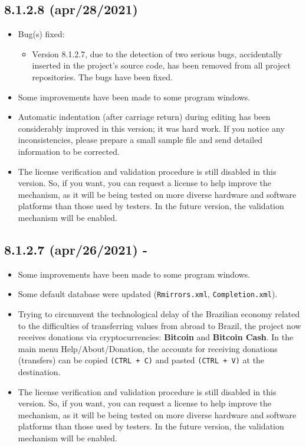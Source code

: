 \subsection*{8.1.2.8 (apr/28/2021)}
\begin{itemize}
  \item Bug(s) fixed:
    \begin{itemize}
      \item Version 8.1.2.7, due to the detection of two serious bugs, accidentally
        inserted in the project's source code, has been removed from all project repositories.
        The bugs have been fixed. \color{darkred}{It is strongly recommended not to use version 8.1.2.7!}
    \end{itemize}
  \item Some improvements have been made to some program windows.
  \item Automatic indentation (after carriage return) during editing has been considerably
    improved in this version; it was hard work. If you notice any inconsistencies,
    please prepare a small sample file and send detailed information to be corrected.
  \item The license verification and validation procedure is still disabled in this version.
    So, if you want, you can request a license to help improve the mechanism,
    as it will be being tested on more diverse hardware and software platforms than
    those used by testers. In the future version, the validation mechanism will be enabled.
\end{itemize}

\subsection*{8.1.2.7 (apr/26/2021) - \color{darkred}{Removed from all project repositories}}
\begin{itemize}
  \item Some improvements have been made to some program windows.
  \item Some default database were updated (\texttt{Rmirrors.xml}, \texttt{Completion.xml}).
  \item Trying to circumvent the technological delay of the Brazilian economy related to
    the difficulties of transferring values from abroad to Brazil, the project now receives
    donations via cryptocurrencies: \textbf{Bitcoin} and \textbf{Bitcoin Cash}.
    In the main menu Help/About/Donation, the accounts for receiving donations (transfers)
    can be copied \texttt{(CTRL + C)} and pasted \texttt{(CTRL + V)} at the destination.
  \item The license verification and validation procedure is still disabled in this version.
    So, if you want, you can request a license to help improve the mechanism,
    as it will be being tested on more diverse hardware and software platforms than
    those used by testers. In the future version, the validation mechanism will be enabled.
\end{itemize}

